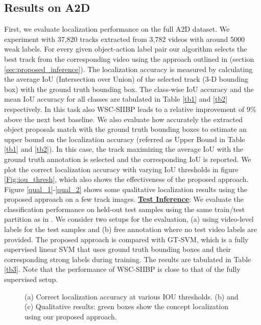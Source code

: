 \documentclass[runningheads]{llncs}
\begin{document}
\subsection{Results on A2D}
First, we evaluate localization performance on the full A2D dataset. We experiment with 37,820 tracks extracted from 3,782 videos with around 5000 weak labels. For every given object-action label pair our algorithm selects the best track from the corresponding video using the approach outlined in (section \ref{sec:proposed_inference}). The localization accuracy is measured by calculating the average IoU (Intersection over Union) of the selected track (3-D bounding box) with the ground truth bounding box. The class-wise IoU accuracy and the mean IoU accuracy for all classes are tabulated in Table \ref{tb1} and \ref{tb2} respectively. In this task also WSC-SIIBP leads to a relative improvement of 9\% above the next best baseline. We also evaluate how accurately the extracted object proposals match with the ground truth bounding boxes to estimate an upper bound on the localization accuracy (referred as Upper Bound in Table \ref{tb1} and \ref{tb2}). In this case, the track maximizing the average IoU with the ground truth annotation is selected and the corresponding IoU is reported. We plot the correct localization accuracy with varying IoU thresholds in figure \ref{Fig:iou_thresh}, which also shows the effectiveness of the proposed approach. Figure \ref{qual_1}-\ref{qual_2} shows some qualitative localization results using the proposed approach on a few track images.
\newline
\noindent
\underline{\bf Test Inference}: We evaluate the classification performance on held-out test samples using the same train/test partition as in \cite{xu2015can}. We consider two setups for the evaluation, (a) using video-level labels for the test samples and (b) free annotation where no test video labels are provided. The proposed approach is compared with GT-SVM, which is a fully supervised linear SVM that uses ground truth bounding boxes and their corresponding strong labels during training. The results are tabulated in Table \ref{tb3}. Note that the performance of WSC-SIIBP is close to that of the fully supervised setup. 
\begin{figure*}[!tp]
\centering
{}
\caption{(a) Correct localization accuracy at various IOU thresholds. (b) and (c) Qualitative results: green boxes show the concept localization using our proposed approach.}
\label{Fig:experimental_result_2}
\end{figure*}
\end{document}
